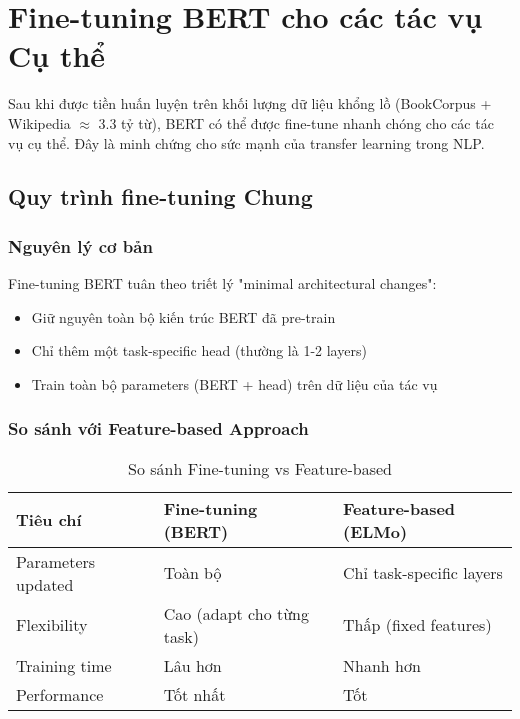 \section{Fine-tuning BERT cho các tác vụ Cụ thể}
\label{sec:fine_tuning_bert}
Sau khi được tiền huấn luyện trên khối lượng dữ liệu khổng lồ (BookCorpus + Wikipedia $\approx$ 3.3 tỷ từ), BERT có thể được fine-tune nhanh chóng cho các tác vụ cụ thể. Đây là minh chứng cho sức mạnh của transfer learning trong NLP.

\subsection{Quy trình fine-tuning Chung}
\label{ssec:quy_trinh_tinh_chinh}

\subsubsection{Nguyên lý cơ bản}
Fine-tuning BERT tuân theo triết lý "minimal architectural changes":
\begin{itemize}
    \item Giữ nguyên toàn bộ kiến trúc BERT đã pre-train
    \item Chỉ thêm một task-specific head (thường là 1-2 layers)
    \item Train toàn bộ parameters (BERT + head) trên dữ liệu của tác vụ
\end{itemize}

\subsubsection{So sánh với Feature-based Approach}
\begin{table}[H]
\centering
\caption{So sánh Fine-tuning vs Feature-based}
\begin{tabular}{lll}
\toprule
\textbf{Tiêu chí} & \textbf{Fine-tuning (BERT)} & \textbf{Feature-based (ELMo)} \\
\midrule
Parameters updated & Toàn bộ & Chỉ task-specific layers \\
Flexibility & Cao (adapt cho từng task) & Thấp (fixed features) \\
Training time & Lâu hơn & Nhanh hơn \\
Performance & Tốt nhất & Tốt \\
\bottomrule
\end{tabular}
\end{table}

